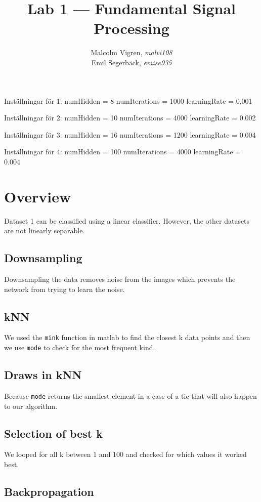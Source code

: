 \documentclass{IEEEtran}
\begin{document}
\title{Lab 1 --- Fundamental Signal Processing}
\author{Malcolm Vigren, \textit{malvi108} \\
        Emil Segerbäck, \textit{emise935}}

\maketitle

Inställningar för 1:
numHidden = 8
numIterations = 1000
learningRate = 0.001

Inställningar för 2:
numHidden = 10
numIterations = 4000
learningRate = 0.002

Inställningar för 3:
numHidden = 16
numIterations = 1200
learningRate = 0.004

Inställningar för 4:
numHidden = 100
numIterations = 4000
learningRate = 0.004

\section{Overview}
Dataset 1 can be classified using a linear classifier. However, the other datasets are not
linearly separable.

\subsection{Downsampling}
Downsampling the data removes noise from the images which prevents the network from trying
to learn the noise.

\subsection{kNN}
We used the \texttt{mink} function in matlab to find the closest k data points and then we
use \texttt{mode} to check for the most frequent kind.

\subsection{Draws in kNN}
Because \texttt{mode} returns the smallest element in a case of a tie that will also
happen to our algorithm.

\subsection{Selection of best k}
We looped for all k between 1 and 100 and checked for which values it worked best.

\subsection{Backpropagation}
\end{document}
